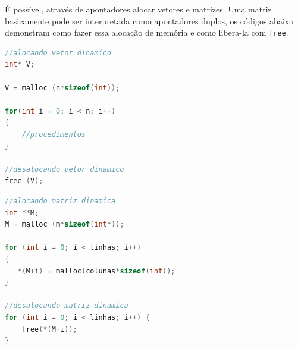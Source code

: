 É possível, através de apontadores alocar vetores e matrizes. Uma matriz basicamente pode ser interpretada como apontadores duplos, os códigos abaixo demonstram como fazer essa alocação de memória e como libera-la com \texttt{free}.

\begin{lstlisting}[language=C, frame=single]
//alocando vetor dinamico
int* V; 

V = malloc (n*sizeof(int));

for(int i = 0; i < n; i++)
{
    //procedimentos
}

//desalocando vetor dinamico
free (V);
\end{lstlisting}

\begin{lstlisting}[language=C, frame=single]
//alocando matriz dinamica
int **M; 
M = malloc (m*sizeof(int*));

for (int i = 0; i < linhas; i++)
{
   *(M+i) = malloc(colunas*sizeof(int));
}

//desalocando matriz dinamica
for (int i = 0; i < linhas; i++) {
    free(*(M+i));
}

\end{lstlisting}